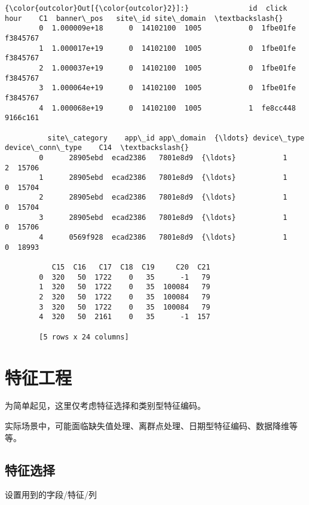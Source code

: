 \documentclass[11pt]{article}
\begin{document}
\begin{Verbatim}[commandchars=\\\{\}]
{\color{outcolor}Out[{\color{outcolor}2}]:}              id  click      hour    C1  banner\_pos   site\_id site\_domain  \textbackslash{}
        0  1.000009e+18      0  14102100  1005           0  1fbe01fe    f3845767   
        1  1.000017e+19      0  14102100  1005           0  1fbe01fe    f3845767   
        2  1.000037e+19      0  14102100  1005           0  1fbe01fe    f3845767   
        3  1.000064e+19      0  14102100  1005           0  1fbe01fe    f3845767   
        4  1.000068e+19      0  14102100  1005           1  fe8cc448    9166c161   
        
          site\_category    app\_id app\_domain  {\ldots} device\_type device\_conn\_type    C14  \textbackslash{}
        0      28905ebd  ecad2386   7801e8d9  {\ldots}           1                2  15706   
        1      28905ebd  ecad2386   7801e8d9  {\ldots}           1                0  15704   
        2      28905ebd  ecad2386   7801e8d9  {\ldots}           1                0  15704   
        3      28905ebd  ecad2386   7801e8d9  {\ldots}           1                0  15706   
        4      0569f928  ecad2386   7801e8d9  {\ldots}           1                0  18993   
        
           C15  C16   C17  C18  C19     C20  C21  
        0  320   50  1722    0   35      -1   79  
        1  320   50  1722    0   35  100084   79  
        2  320   50  1722    0   35  100084   79  
        3  320   50  1722    0   35  100084   79  
        4  320   50  2161    0   35      -1  157  
        
        [5 rows x 24 columns]
\end{Verbatim}
            
    \section{特征工程}\label{ux7279ux5f81ux5de5ux7a0b}

为简单起见，这里仅考虑特征选择和类别型特征编码。

实际场景中，可能面临缺失值处理、离群点处理、日期型特征编码、数据降维等等。

    \subsection{特征选择}\label{ux7279ux5f81ux9009ux62e9}

设置用到的字段/特征/列
\end{document}
